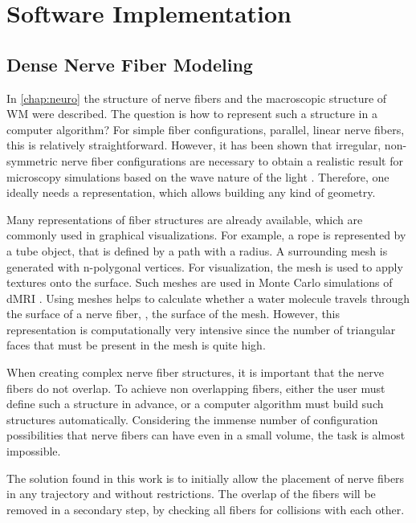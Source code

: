 \newpage\null\thispagestyle{empty}\newpage
\clearpage{\thispagestyle{empty}\cleardoublepage}
\part{Software Implementation}
\parttoc
% 
% 
% 
\setcounter{chapter}{4}
\chapter{Dense Nerve Fiber Modeling}
\label{chap:sof:modeling}
% 
In \cref{chap:neuro} the structure of nerve fibers and the macroscopic structure of \ac{WM} were described.
The question is how to represent such a structure in a computer algorithm?
For simple fiber configurations, \eg{} parallel, linear nerve fibers, this is relatively straightforward.
However, it has been shown that irregular, non-symmetric nerve fiber configurations are necessary to obtain a realistic result for microscopy simulations based on the wave nature of the light \cite{MenzelDissertation}.
Therefore, one ideally needs a representation, which allows building any kind of geometry.
\par
%
Many representations of fiber structures are already available, which are commonly used in graphical visualizations.
For example, a rope is represented by a tube object, that is defined by a path with a radius.
A surrounding mesh is generated with n-polygonal vertices.
For visualization, the mesh is used to apply textures onto the surface.
Such meshes are \eg{} used in Monte Carlo simulations of \ac{dMRI} \cite{Ginsburger2019,ginsburgerDis2019}.
Using meshes helps to calculate whether a water molecule travels through the surface of a nerve fiber, \ie{}, the surface of the mesh.
However, this representation is computationally very intensive since the number of triangular faces that must be present in the mesh is quite high.
\par
%
When creating complex nerve fiber structures, it is important that the nerve fibers do not overlap.
To achieve non overlapping fibers, either the user must define such a structure in advance, or a computer algorithm must build such structures automatically.
Considering the immense number of configuration possibilities that nerve fibers can have even in a small volume, the task is almost impossible.
\par
%
The solution found in this work is to initially allow the placement of nerve fibers in any trajectory and without restrictions.
The overlap of the fibers will be removed in a secondary step, by checking all fibers for collisions with each other.
